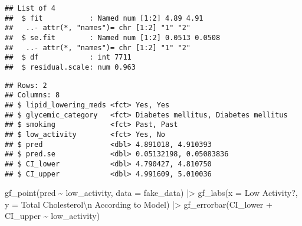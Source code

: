 \documentclass[
]{article}
\newenvironment{Shaded}{\begin{snugshade}}{\end{snugshade}}
\newcommand{\AttributeTok}[1]{\textcolor[rgb]{0.77,0.63,0.00}{#1}}
\newcommand{\FloatTok}[1]{\textcolor[rgb]{0.00,0.00,0.81}{#1}}
\newcommand{\FunctionTok}[1]{\textcolor[rgb]{0.00,0.00,0.00}{#1}}
\newcommand{\NormalTok}[1]{#1}
\newcommand{\OtherTok}[1]{\textcolor[rgb]{0.56,0.35,0.01}{#1}}
\newcommand{\SpecialCharTok}[1]{\textcolor[rgb]{0.00,0.00,0.00}{#1}}
\newcommand{\StringTok}[1]{\textcolor[rgb]{0.31,0.60,0.02}{#1}}
\begin{document}
\begin{verbatim}
## List of 4
##  $ fit           : Named num [1:2] 4.89 4.91
##   ..- attr(*, "names")= chr [1:2] "1" "2"
##  $ se.fit        : Named num [1:2] 0.0513 0.0508
##   ..- attr(*, "names")= chr [1:2] "1" "2"
##  $ df            : int 7711
##  $ residual.scale: num 0.963
\end{verbatim}

\begin{Shaded}
\end{Shaded}

\begin{verbatim}
## Rows: 2
## Columns: 8
## $ lipid_lowering_meds <fct> Yes, Yes
## $ glycemic_category   <fct> Diabetes mellitus, Diabetes mellitus
## $ smoking             <fct> Past, Past
## $ low_activity        <fct> Yes, No
## $ pred                <dbl> 4.891018, 4.910393
## $ pred.se             <dbl> 0.05132198, 0.05083836
## $ CI_lower            <dbl> 4.790427, 4.810750
## $ CI_upper            <dbl> 4.991609, 5.010036
\end{verbatim}

\begin{Shaded}
\begin{Highlighting}[]
\FunctionTok{gf\_point}\NormalTok{(pred }\SpecialCharTok{\textasciitilde{}}\NormalTok{ low\_activity,}
        \AttributeTok{data =}\NormalTok{ fake\_data) }\SpecialCharTok{|\textgreater{}}
  \FunctionTok{gf\_labs}\NormalTok{(}\AttributeTok{x =} \StringTok{\textquotesingle{}Low Activity?\textquotesingle{}}\NormalTok{, }\AttributeTok{y =} \StringTok{\textquotesingle{}Total Cholesterol}\SpecialCharTok{\textbackslash{}n}\StringTok{ According to Model\textquotesingle{}}\NormalTok{) }\SpecialCharTok{|\textgreater{}}
  \FunctionTok{gf\_errorbar}\NormalTok{(CI\_lower }\SpecialCharTok{+}\NormalTok{ CI\_upper }\SpecialCharTok{\textasciitilde{}}\NormalTok{ low\_activity)}
\end{Highlighting}
\end{Shaded}
\end{document}
